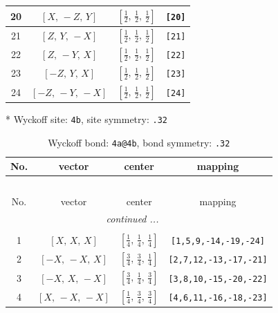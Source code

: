 \documentclass[fleqn,8pt]{jsarticle}
\begin{document}
\begin{longtable}{cccc}
20 & $\left[ X,\, - Z,\, Y \right]$ & $\left[ \frac{1}{2},\, \frac{1}{2},\, \frac{1}{2} \right]$ & {\tt [20]} \\ \hline
21 & $\left[ Z,\, Y,\, - X \right]$ & $\left[ \frac{1}{2},\, \frac{1}{2},\, \frac{1}{2} \right]$ & {\tt [21]} \\ \hline
22 & $\left[ Z,\, - Y,\, X \right]$ & $\left[ \frac{1}{2},\, \frac{1}{2},\, \frac{1}{2} \right]$ & {\tt [22]} \\ \hline
23 & $\left[ - Z,\, Y,\, X \right]$ & $\left[ \frac{1}{2},\, \frac{1}{2},\, \frac{1}{2} \right]$ & {\tt [23]} \\ \hline
24 & $\left[ - Z,\, - Y,\, - X \right]$ & $\left[ \frac{1}{2},\, \frac{1}{2},\, \frac{1}{2} \right]$ & {\tt [24]} \\
\end{longtable}
* Wyckoff site: {\tt 4b}, site symmetry: {\tt .32}
\renewcommand{\arraystretch}{1.2}
\begin{longtable}{cccc}
\caption{Wyckoff bond: {\tt 4a@4b}, bond symmetry: {\tt .32}}
 \\
 \hline \hline
No. & vector & center & mapping \\ \hline \endfirsthead

\multicolumn{3}{l}{\tablename\ \thetable{}} \\
 \hline \hline
No. & vector & center & mapping \\ \hline \endhead

 \hline \hline
\multicolumn{3}{r}{\footnotesize\it continued ...} \\ \endfoot

 \hline \hline
\multicolumn{3}{r}{} \\ \endlastfoot

1 & $\left[ X,\, X,\, X \right]$ & $\left[ \frac{1}{4},\, \frac{1}{4},\, \frac{1}{4} \right]$ & {\tt [1,5,9,-14,-19,-24]} \\ \hline
2 & $\left[ - X,\, - X,\, X \right]$ & $\left[ \frac{3}{4},\, \frac{3}{4},\, \frac{1}{4} \right]$ & {\tt [2,7,12,-13,-17,-21]} \\ \hline
3 & $\left[ - X,\, X,\, - X \right]$ & $\left[ \frac{3}{4},\, \frac{1}{4},\, \frac{3}{4} \right]$ & {\tt [3,8,10,-15,-20,-22]} \\ \hline
4 & $\left[ X,\, - X,\, - X \right]$ & $\left[ \frac{1}{4},\, \frac{3}{4},\, \frac{3}{4} \right]$ & {\tt [4,6,11,-16,-18,-23]} \\
\end{longtable}
\renewcommand{\arraystretch}{1.2}
\end{document}
